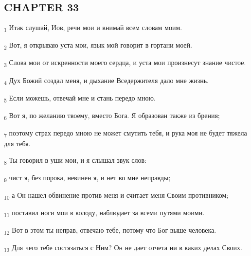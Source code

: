 \subsection{CHAPTER 33}
\begin{tcolorbox}
\textsubscript{1} Итак слушай, Иов, речи мои и внимай всем словам моим.
\end{tcolorbox}
\begin{tcolorbox}
\textsubscript{2} Вот, я открываю уста мои, язык мой говорит в гортани моей.
\end{tcolorbox}
\begin{tcolorbox}
\textsubscript{3} Слова мои от искренности моего сердца, и уста мои произнесут знание чистое.
\end{tcolorbox}
\begin{tcolorbox}
\textsubscript{4} Дух Божий создал меня, и дыхание Вседержителя дало мне жизнь.
\end{tcolorbox}
\begin{tcolorbox}
\textsubscript{5} Если можешь, отвечай мне и стань передо мною.
\end{tcolorbox}
\begin{tcolorbox}
\textsubscript{6} Вот я, по желанию твоему, вместо Бога. Я образован также из брения;
\end{tcolorbox}
\begin{tcolorbox}
\textsubscript{7} поэтому страх передо мною не может смутить тебя, и рука моя не будет тяжела для тебя.
\end{tcolorbox}
\begin{tcolorbox}
\textsubscript{8} Ты говорил в уши мои, и я слышал звук слов:
\end{tcolorbox}
\begin{tcolorbox}
\textsubscript{9} чист я, без порока, невинен я, и нет во мне неправды;
\end{tcolorbox}
\begin{tcolorbox}
\textsubscript{10} а Он нашел обвинение против меня и считает меня Своим противником;
\end{tcolorbox}
\begin{tcolorbox}
\textsubscript{11} поставил ноги мои в колоду, наблюдает за всеми путями моими.
\end{tcolorbox}
\begin{tcolorbox}
\textsubscript{12} Вот в этом ты неправ, отвечаю тебе, потому что Бог выше человека.
\end{tcolorbox}
\begin{tcolorbox}
\textsubscript{13} Для чего тебе состязаться с Ним? Он не дает отчета ни в каких делах Своих.
\end{tcolorbox}
